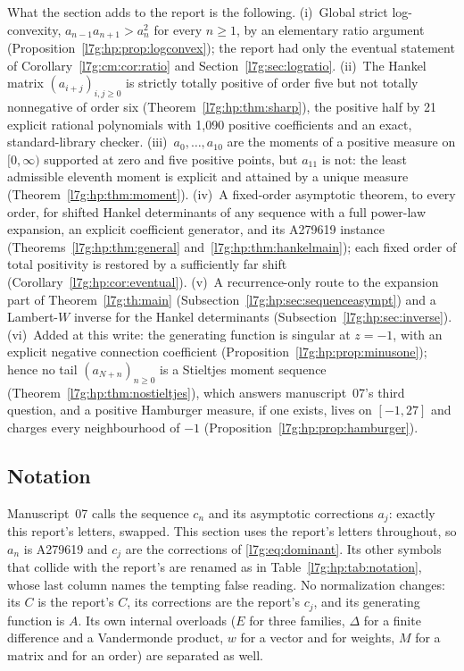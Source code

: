 \documentclass[11pt,letterpaper]{article}
\theoremstyle{remark}\newtheorem{remark}[theorem]{Remark}
\newcounter{l7gtrsavedeq}
\begin{document}
What the section adds to the report is the following.
(i)~Global strict log-convexity, $a_{n-1}a_{n+1}>a_n^2$ for every
$n\ge1$, by an elementary ratio argument
(Proposition~\ref{l7g:hp:prop:logconvex}); the report had only the eventual
statement of Corollary~\ref{l7g:cm:cor:ratio} and
Section~\ref{l7g:sec:logratio}.
(ii)~The Hankel matrix $(a_{i+j})_{i,j\ge0}$ is strictly totally positive
of order five but not totally nonnegative of order six
(Theorem~\ref{l7g:hp:thm:sharp}), the positive half by 21 explicit rational
polynomials with 1{,}090 positive coefficients and an exact,
standard-library checker.
(iii)~$a_0,\dots,a_{10}$ are the moments of a positive measure on
$[0,\infty)$ supported at zero and five positive points, but $a_{11}$ is
not: the least admissible eleventh moment is explicit and attained by a
unique measure (Theorem~\ref{l7g:hp:thm:moment}).
(iv)~A fixed-order asymptotic theorem, to every order, for shifted Hankel
determinants of any sequence with a full power-law expansion, an explicit
coefficient generator, and its A279619 instance
(Theorems~\ref{l7g:hp:thm:general} and~\ref{l7g:hp:thm:hankelmain}); each
fixed order of total positivity is restored by a sufficiently far shift
(Corollary~\ref{l7g:hp:cor:eventual}).
(v)~A recurrence-only route to the expansion part of
Theorem~\ref{l7g:th:main} (Subsection~\ref{l7g:hp:sec:sequenceasympt}) and
a Lambert-$W$ inverse for the Hankel determinants
(Subsection~\ref{l7g:hp:sec:inverse}).
(vi)~Added at this write: the generating function is singular at $z=-1$,
with an explicit negative connection coefficient
(Proposition~\ref{l7g:hp:prop:minusone}); hence no tail
$(a_{N+n})_{n\ge0}$ is a Stieltjes moment sequence
(Theorem~\ref{l7g:hp:thm:nostieltjes}), which answers manuscript~07's
third question, and a positive Hamburger measure, if one exists, lives on
$[-1,27]$ and charges every neighbourhood of $-1$
(Proposition~\ref{l7g:hp:prop:hamburger}).

\subsection{Notation}\label{l7g:hp:sec:notation}
Manuscript~07 calls the sequence $c_n$ and its asymptotic corrections
$a_j$: exactly this report's letters, swapped. This section uses the
report's letters throughout, so $a_n$ is A279619 and $c_j$ are the
corrections of \eqref{l7g:eq:dominant}. Its other symbols that collide with
the report's are renamed as in Table~\ref{l7g:hp:tab:notation}, whose last
column names the tempting false reading. No normalization changes: its
$C$ is the report's $C$, its corrections are the report's $c_j$, and its
generating function is $A$. Its own internal overloads ($E$ for three
families, $\Delta$ for a finite difference and a Vandermonde product, $w$
for a vector and for weights, $M$ for a matrix and for an order) are
separated as well.
\end{document}
